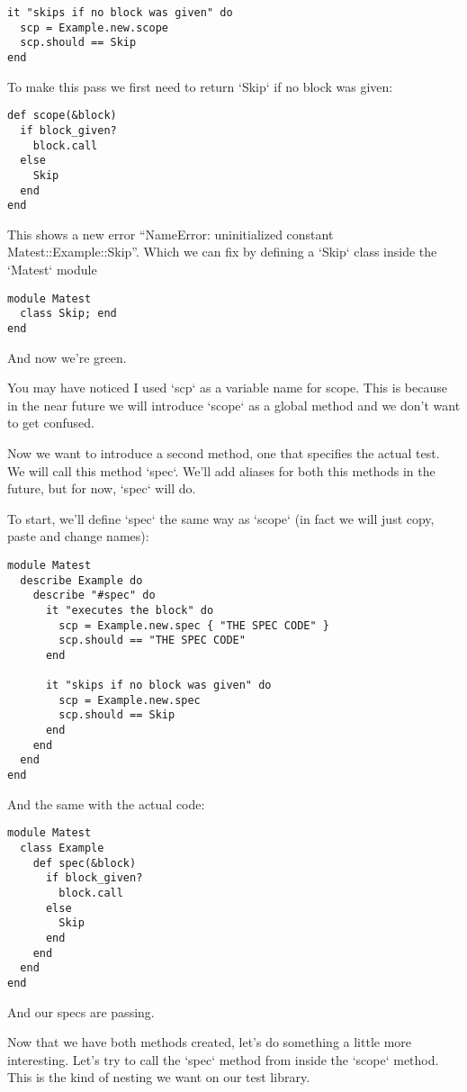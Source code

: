 \documentclass[11pt]{article}
\begin{document}
\begin{verbatim}
it "skips if no block was given" do
  scp = Example.new.scope
  scp.should == Skip
end
\end{verbatim}

To make this pass we first need to return `Skip` if no block was given:


\begin{verbatim}
def scope(&block)
  if block_given?
    block.call
  else
    Skip
  end
end
\end{verbatim}

This shows a new error ``NameError: uninitialized constant Matest::Example::Skip''. Which we can fix by defining a `Skip` class inside the `Matest` module


\begin{verbatim}
module Matest
  class Skip; end
end
\end{verbatim}

And now we're green.

You may have noticed I used `scp` as a variable name for scope. This is because in the near future we will introduce `scope` as a global method and we don't want to get confused.

Now we want to introduce a second method, one that specifies the actual test. We will call this method `spec`. We'll add aliases for both this methods in the future, but for now, `spec` will do.

To start, we'll define `spec` the same way as `scope` (in fact we will just copy, paste and change names):


\begin{verbatim}
module Matest
  describe Example do
    describe "#spec" do
      it "executes the block" do
        scp = Example.new.spec { "THE SPEC CODE" }
        scp.should == "THE SPEC CODE"
      end

      it "skips if no block was given" do
        scp = Example.new.spec
        scp.should == Skip
      end
    end
  end
end
\end{verbatim}

And the same with the actual code: 


\begin{verbatim}
module Matest
  class Example
    def spec(&block)
      if block_given?
        block.call
      else
        Skip
      end
    end
  end
end
\end{verbatim}

And our specs are passing. 

Now that we have both methods created, let's do something a little more interesting. Let's try to call the `spec` method from inside the `scope` method. This is the kind of nesting we want on our test library.
\end{document}
